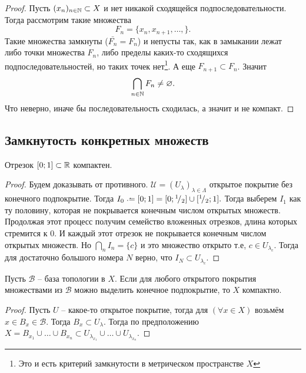 \begin{proof}
    Пусть $(x_n)_{n\in \mathbb N}\subset X$ и нет никакой сходящейся подпоследовательности. Тогда рассмотрим такие множества \[F_n = \{x_n, x_{n+1}, \ldots, \}.\]
    Такие множества замкнуты ($\bar{F_n} = F_n$) и непусты так, как в замыкании лежат либо точки множества $F_n$, либо пределы каких-то сходящихся подпоследовательностей, но таких точек нет\footnote{Это и есть критерий замкнутости в метрическом пространстве $X$}.  А еще $F_{n+1} \subset F_n$. Значит \[\bigcap_{n\in \mathbb N} F_n \neq \varnothing.\] Что неверно, иначе бы последовательность сходилась, а значит и не компакт.
\end{proof}

\subsection{Замкнутость конкретных множеств}

\begin{theorem}
    Отрезок $[0;1]\subset \mathbb R$ компактен.
\end{theorem}
\begin{proof}
     Будем доказывать от противного. $\mathcal U = (U_\lambda)_{\lambda\in{\Lambda}}$ открытое покрытие без конечного подпокрытие. Тогда $I_0 \coloneq [0;1]=[0;\rfrac 1 2 ]\cup [\rfrac 1 2; 1].$ Тогда выберем $I_1$ как ту половину, которая не покрывается конечным числом открытых множеств. Продолжая этот процесс получим семейство вложенных отрезков, длина которых стремится к 0. И каждый этот отрезок не покрывается конечным числом открытых множеств. Но \(\bigcap_{n} I_n = \{c\}\) и это множество открыто т.е, $c\in U_{\lambda_{c}}$. Тогда для достаточно большого номера $N$ верно, что $I_N \subset U_{\lambda_c}.$
\end{proof}

\begin{lemma}
    Пусть $\mathcal B$ -- база топологии в $X$. Если для любого открытого покрытия множествами из $\mathcal B$ можно выделить конечное подпокрытие, то $X$ компактно.
\end{lemma}
\begin{proof}
    Пусть $U$ -- какое-то открытое покрытие, тогда для $(\forall x \in X)$  возьмём $x\in B_x \in \mathcal B$. Тогда $B_x \subset U_\lambda.$ Тогда по предположению $X = B_{x_1} \cup \ldots \cup B_{x_n} \subset U_{\lambda_{x_1}}\cup \ldots \cup U_{\lambda_{x_n}}.$
\end{proof}

